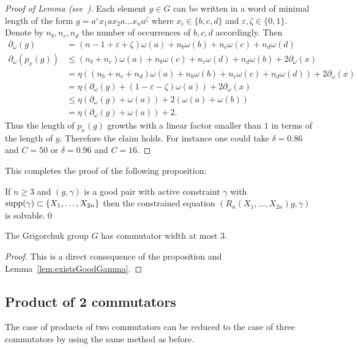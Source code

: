 \documentclass[a4paper,11pt]{amsart}
\begin{document}
\begin{proof}[Proof of Lemma (see~{\cite[Proposition~5]{Bartholdi:Growth}})] 
 Each element $g\in G$ can be written in a word of minimal length of the form $g=a^\varepsilon x_1 a x_2 a\ldots x_n a^\zeta$ where
 $x_i\in \{b,c,d\}$ and $\varepsilon,\zeta\in \{0,1\}$. Denote by $n_b,n_c,n_d$ the number of occurrences of $b,c,d$ accordingly. 
 Then
 \begin{align*}
  \partial_\omega(g) &= (n-1+\varepsilon+\zeta)\omega(a)+n_b\omega(b)+n_c\omega(c)+n_d\omega(d)\\
  \partial_\omega(p_x(g)) &\leq (n_b+n_c)\omega(a)+n_b\omega(c)+n_c\omega(d)+n_d\omega(b) + 2\partial_\omega(x)\\
  &= \eta\left( (n_b+n_c+n_d)\omega(a)+n_b\omega(b)+n_c\omega(c)+n_d\omega(d) \right) + 2\partial_\omega(x)\\
  &= \eta(\partial_\omega(g) +(1-\varepsilon-\zeta)\omega(a)) + 2\partial_\omega(x) \\
  &\leq \eta(\partial_\omega(g)+\omega(a)) + 2(\omega(a)+\omega(b))\\
  &= \eta(\partial_\omega(g)+\omega(a)) + 2.
 \end{align*}
 Thus the length of $p_x(g)$ growths with a linear factor smaller than $1$ in terms of the length of $g$. Therefore the claim holds.
 For instance one could take $\delta =0.86$ and $C=50$ or $\delta=0.96$ and $C=16$.
\end{proof}
This completes the proof of the following proposition:
\begin{pro}\label{pro:solvableConstraintedEquations}
 If $n\geq3$ and $(g,\gamma)$ is a good pair with active constraint $\gamma$ with $\operatorname{{supp}}(\gamma)\subset\{X_1,\ldots,X_{2n}\}$
 then the constrained equation $(R_n(X_1,\ldots,X_{2n})g,\gamma)$ is solvable.\qed
\end{pro}
\begin{cor}
 The Grigorchuk group $G$ has commutator width at most $3$.
\end{cor}
\begin{proof}
 This is a direct consequence of the proposition and Lemma~\ref{lem:existsGoodGamma}.
\end{proof}

\subsection{Product of 2 commutators}
The case of products of two commutators can be reduced to the case of three commutators by using the same method as before.
\end{document}
